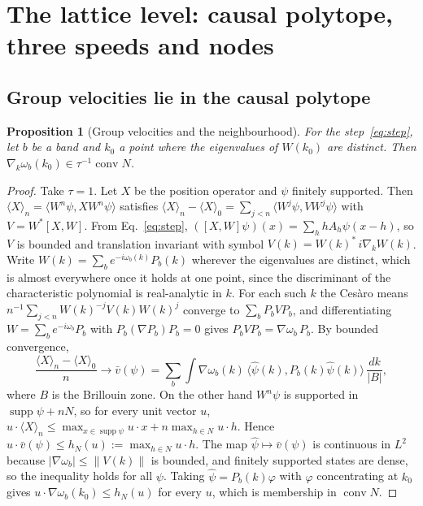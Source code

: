 \documentclass[12pt]{article}
\newtheorem{proposition}[theorem]{Proposition}
\theoremstyle{definition}
\theoremstyle{remark}
\newcommand{\conv}{\operatorname{conv}}
\begin{document}
\section{The lattice level: causal polytope, three speeds and nodes}
\label{sec:lattice}

\subsection{Group velocities lie in the causal polytope}

\begin{proposition}[Group velocities and the neighbourhood]
\label{prop:polytope}
For the step~\eqref{eq:step}, let $b$ be a band and $k_0$ a point where the eigenvalues of $W(k_0)$ are distinct. Then $\nabla_k\omega_b(k_0)\in\tau^{-1}\conv N$.
\end{proposition}

\begin{proof}
Take $\tau=1$. Let $X$ be the position operator and $\psi$ finitely supported. Then $\langle X\rangle_n=\langle W^n\psi,XW^n\psi\rangle$ satisfies $\langle X\rangle_n-\langle X\rangle_0=\sum_{j<n}\langle W^j\psi,VW^j\psi\rangle$ with $V=W^*[X,W]$. From Eq.~\eqref{eq:step}, $([X,W]\psi)(x)=\sum_hhA_h\psi(x-h)$, so $V$ is bounded and translation invariant with symbol $V(k)=W(k)^*\,i\nabla_kW(k)$. Write $W(k)=\sum_be^{-i\omega_b(k)}P_b(k)$ wherever the eigenvalues are distinct, which is almost everywhere once it holds at one point, since the discriminant of the characteristic polynomial is real-analytic in $k$. For each such $k$ the Ces\`aro means $n^{-1}\sum_{j<n}W(k)^{-j}V(k)W(k)^j$ converge to $\sum_bP_bVP_b$, and differentiating $W=\sum_be^{-i\omega_b}P_b$ with $P_b(\nabla P_b)P_b=0$ gives $P_bVP_b=\nabla\omega_b\,P_b$. By bounded convergence,
\[
\frac{\langle X\rangle_n-\langle X\rangle_0}{n}\longrightarrow\bar v(\psi)=\sum_b\int\nabla\omega_b(k)\,\langle\hat\psi(k),P_b(k)\hat\psi(k)\rangle\,\frac{dk}{|B|},
\]
where $B$ is the Brillouin zone.
On the other hand $W^n\psi$ is supported in $\operatorname{supp}\psi+nN$, so for every unit vector $u$, $u\cdot\langle X\rangle_n\le\max_{x\in\operatorname{supp}\psi}u\cdot x+n\max_{h\in N}u\cdot h$. Hence $u\cdot\bar v(\psi)\le h_N(u):=\max_{h\in N}u\cdot h$. The map $\hat\psi\mapsto\bar v(\psi)$ is continuous in $L^2$ because $|\nabla\omega_b|\le\|V(k)\|$ is bounded, and finitely supported states are dense, so the inequality holds for all $\psi$. Taking $\hat\psi=P_b(k)\varphi$ with $\varphi$ concentrating at $k_0$ gives $u\cdot\nabla\omega_b(k_0)\le h_N(u)$ for every $u$, which is membership in $\conv N$.
\end{proof}
\end{document}
